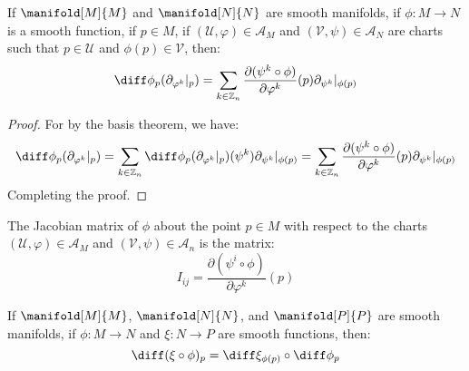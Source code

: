 \documentclass{article}                                                        %
\begin{document}
            \begin{theorem}
                If $\manifold[M]{M}$ and $\manifold[N]{N}$ are smooth manifolds,
                if $\phi:M\rightarrow{N}$ is a smooth function, if $p\in{M}$, if
                $(\mathcal{U},\varphi)\in\mathcal{A}_{M}$ and
                $(\mathcal{V},\psi)\in\mathcal{A}_{N}$ are charts such that
                $p\in\mathcal{U}$ and $\phi(p)\in\mathcal{V}$, then:
                \begin{equation}
                    \diff\phi_{p}(\partial_{\varphi^{k}}|_{p})=
                    \sum_{k\in\mathbb{Z}_{n}}
                    \frac{\partial(\psi^{k}\circ\phi)}{\partial\varphi^{k}}(p)
                    \partial_{\psi^{k}}|_{\phi(p)}
                \end{equation}
            \end{theorem}
            \begin{proof}
                For by the basis theorem, we have:
                \begin{equation}
                    \diff\phi_{p}(\partial_{\varphi^{k}}|_{p})=
                    \sum_{k\in\mathbb{Z}_{n}}
                    \diff\phi_{p}(\partial_{\varphi^{k}}|_{p})(\psi^{k})
                    \partial_{\psi^{k}}|_{\phi(p)}
                    =\sum_{k\in\mathbb{Z}_{n}}
                    \frac{\partial(\psi^{k}\circ\phi)}{\partial\varphi^{k}}(p)
                    \partial_{\psi^{k}}|_{\phi(p)}
                \end{equation}
                Completing the proof.
            \end{proof}
            The Jacobian matrix of $\phi$ about the point $p\in{M}$ with respect
            to the charts $(\mathcal{U},\varphi)\in\mathcal{A}_{M}$ and
            $(\mathcal{V},\psi)\in\mathcal{A}_{n}$ is the matrix:
            \begin{equation}
                I_{ij}=
                \frac{\partial(\psi^{i}\circ\phi)}{\partial\varphi^{k}}(p)
            \end{equation}
            \begin{theorem}
                If $\manifold[M]{M}$, $\manifold[N]{N}$, and $\manifold[P]{P}$
                are smooth manifolds, if $\phi:M\rightarrow{N}$ and
                $\xi:N\rightarrow{P}$ are smooth functions, then:
                \begin{equation}
                    \diff(\xi\circ\phi)_{p}=
                    \diff\xi_{\phi(p)}\circ\diff\phi_{p}
                \end{equation}
            \end{theorem}
\end{document}
